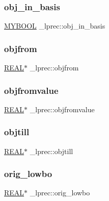 \subsubsection{\texorpdfstring{obj\+\_\+in\+\_\+basis}{obj\_in\_basis}}
{\footnotesize\ttfamily \hyperlink{lp__lib_8h_aad848328fb3018217ac9f01d97b6bd88}{M\+Y\+B\+O\+OL} \+\_\+lprec\+::obj\+\_\+in\+\_\+basis}

\mbox{\label{struct__lprec_aae9b86f5f1815b0ab4f36b89e585b68a}} 
\subsubsection{\texorpdfstring{objfrom}{objfrom}}
{\footnotesize\ttfamily \hyperlink{lp__lib_8h_a92bd5e363d131fa73669358edb232dce}{R\+E\+AL}$\ast$ \+\_\+lprec\+::objfrom}

\mbox{\label{struct__lprec_a71ce6109d646cccdadacf57e28722b1e}} 
\subsubsection{\texorpdfstring{objfromvalue}{objfromvalue}}
{\footnotesize\ttfamily \hyperlink{lp__lib_8h_a92bd5e363d131fa73669358edb232dce}{R\+E\+AL}$\ast$ \+\_\+lprec\+::objfromvalue}

\mbox{\label{struct__lprec_a02cdedc1d5eba13fd541dab7c2b7668d}} 
\subsubsection{\texorpdfstring{objtill}{objtill}}
{\footnotesize\ttfamily \hyperlink{lp__lib_8h_a92bd5e363d131fa73669358edb232dce}{R\+E\+AL}$\ast$ \+\_\+lprec\+::objtill}

\mbox{\label{struct__lprec_a383e7faeb3c8cd96abf335348e060f4c}} 
\subsubsection{\texorpdfstring{orig\+\_\+lowbo}{orig\_lowbo}}
{\footnotesize\ttfamily \hyperlink{lp__lib_8h_a92bd5e363d131fa73669358edb232dce}{R\+E\+AL}$\ast$ \+\_\+lprec\+::orig\+\_\+lowbo}

